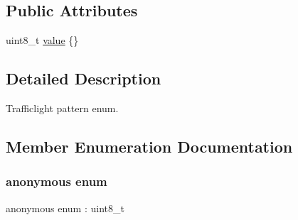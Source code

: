 \subsection*{Public Attributes}
\begin{DoxyCompactItemize}
\item 
uint8\+\_\+t \hyperlink{structmaf__perception__interface_1_1TrafficLightPatternEnum_ab36c3e09874c7bf7f24f84703da8d380}{value} \{\}
\end{DoxyCompactItemize}


\subsection{Detailed Description}
Trafficlight pattern enum. 

\subsection{Member Enumeration Documentation}
\mbox{\label{structmaf__perception__interface_1_1TrafficLightPatternEnum_a48ed97085a18a909e078227c6b60ff23}} 
\subsubsection{\texorpdfstring{anonymous enum}{anonymous enum}}
{\footnotesize\ttfamily anonymous enum \+: uint8\+\_\+t}


